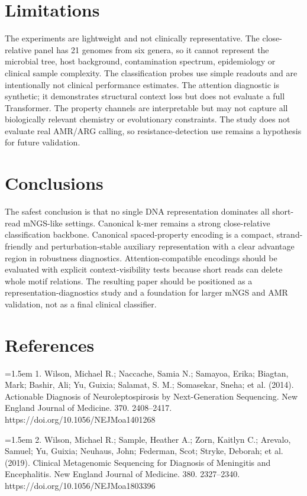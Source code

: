 \documentclass[11pt]{article}
\begin{document}
\section*{Limitations}

The experiments are lightweight and not clinically representative. The close-relative panel has 21 genomes from six genera, so it cannot represent the microbial tree, host background, contamination spectrum, epidemiology or clinical sample complexity. The classification probes use simple readouts and are intentionally not clinical performance estimates. The attention diagnostic is synthetic; it demonstrates structural context loss but does not evaluate a full Transformer. The property channels are interpretable but may not capture all biologically relevant chemistry or evolutionary constraints. The study does not evaluate real AMR/ARG calling, so resistance-detection use remains a hypothesis for future validation.


\section*{Conclusions}

The safest conclusion is that no single DNA representation dominates all short-read mNGS-like settings. Canonical k-mer remains a strong close-relative classification backbone. Canonical spaced-property encoding is a compact, strand-friendly and perturbation-stable auxiliary representation with a clear advantage region in robustness diagnostics. Attention-compatible encodings should be evaluated with explicit context-visibility tests because short reads can delete whole motif relations. The resulting paper should be positioned as a representation-diagnostics study and a foundation for larger mNGS and AMR validation, not as a final clinical classifier.


\section*{References}

\hangindent=1.5em  1. Wilson, Michael R.; Naccache, Samia N.; Samayoa, Erika; Biagtan, Mark; Bashir, Ali; Yu, Guixia; Salamat, S. M.; Somasekar, Sneha; et al. (2014). Actionable Diagnosis of Neuroleptospirosis by Next-Generation Sequencing. New England Journal of Medicine. 370. 2408--2417. https://doi.org/10.1056/NEJMoa1401268\par

\hangindent=1.5em  2. Wilson, Michael R.; Sample, Heather A.; Zorn, Kaitlyn C.; Arevalo, Samuel; Yu, Guixia; Neuhaus, John; Federman, Scot; Stryke, Deborah; et al. (2019). Clinical Metagenomic Sequencing for Diagnosis of Meningitis and Encephalitis. New England Journal of Medicine. 380. 2327--2340. https://doi.org/10.1056/NEJMoa1803396\par
\end{document}

